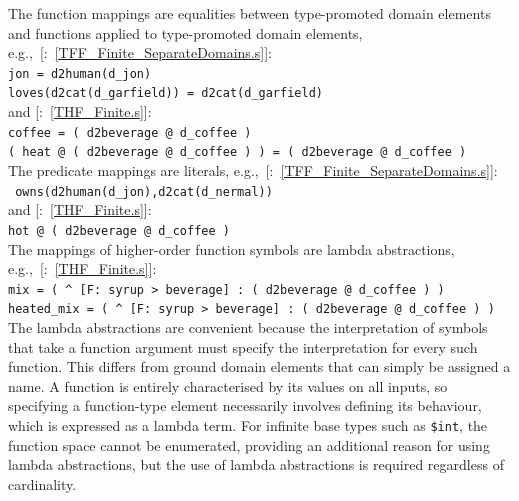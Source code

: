\documentclass{easychair}
\newcommand{\smalltt}[1]{\small \texttt{#1}}
\newcommand{\example}{{\scriptsize \faFile[regular]}}
\newcommand{\tildenot}{\raisebox{0.4ex}{\texttildelow}}
\begin{document}
The function mappings are equalities between type-promoted domain elements and functions applied 
to type-promoted domain elements, e.g.,~[\example{}:~\ref{TFF_Finite_SeparateDomains.s}]:\\
\hspace*{0.5cm}\smalltt{jon = d2human(d\_jon)}\\
\hspace*{0.5cm}\smalltt{loves(d2cat(d\_garfield)) = d2cat(d\_garfield)}\\
and [\example{}:~\ref{THF_Finite.s}]:\\
\hspace*{0.5cm}\smalltt{coffee = ( d2beverage @ d\_coffee )}\\
\hspace*{0.5cm}\smalltt{( heat @ ( d2beverage @ d\_coffee ) ) = ( d2beverage @ d\_coffee )}\\
The predicate mappings are literals, 
e.g.,~[\example{}:~\ref{TFF_Finite_SeparateDomains.s}]:\\
\hspace*{0.5cm}\smalltt{\tildenot{}\,owns(d2human(d\_jon),d2cat(d\_nermal))}\\
and [\example{}:~\ref{THF_Finite.s}]:\\
\hspace*{0.5cm}\smalltt{hot @ ( d2beverage @ d\_coffee )}\\
The mappings of higher-order function symbols are lambda abstractions, 
e.g.,~[\example{}:~\ref{THF_Finite.s}]:\\
\hspace*{0.5cm}\smalltt{mix = ( \textasciicircum~[F: syrup > beverage] : ( d2beverage @ d\_coffee ) )}\\
\hspace*{0.5cm}\smalltt{heated\_mix = ( \textasciicircum~[F: syrup > beverage] : ( d2beverage @ d\_coffee ) )}\\
The lambda abstractions are convenient because the interpretation of symbols that take a function 
argument must specify the interpretation for every such function. 
This differs from ground domain elements that can simply be assigned a name. 
A function is entirely characterised by its values on all inputs, so specifying a function-type 
element necessarily involves defining its behaviour, which is expressed as a lambda term. 
For infinite base types such as \smalltt{\$int}, the function space cannot be enumerated, 
providing an additional reason for using lambda abstractions, but the use of lambda abstractions 
is required regardless of cardinality.
\end{document}
